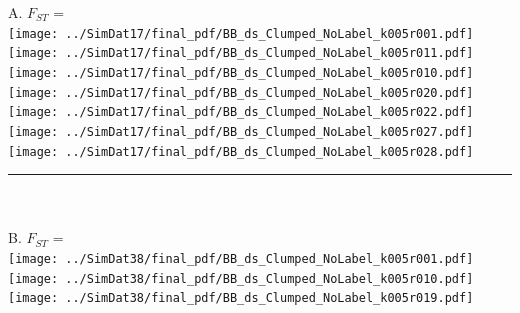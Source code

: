 \documentclass[varwidth=true, border={80, 10}]{standalone}
\newlength{\nameraise}
\newlength{\nameoverhang}
\begin{document}
 
 A. $F_{ST}$ = \\
\texttt{[image: ../SimDat17/final\_pdf/BB\_ds\_Clumped\_NoLabel\_k005r001.pdf]}~\hspace*{-\nameoverhang}\raisebox{\nameraise}{STRUCTURE A.C (9/9)} \\
\texttt{[image: ../SimDat17/final\_pdf/BB\_ds\_Clumped\_NoLabel\_k005r011.pdf]}~\hspace*{-\nameoverhang}\raisebox{\nameraise}{STRUCTURE NA.C (8/9)} \\
\texttt{[image: ../SimDat17/final\_pdf/BB\_ds\_Clumped\_NoLabel\_k005r010.pdf]}~\hspace*{-\nameoverhang}\raisebox{\nameraise}{STRUCTURE NA.C  (1/9)} \\
\texttt{[image: ../SimDat17/final\_pdf/BB\_ds\_Clumped\_NoLabel\_k005r020.pdf]}~\hspace*{-\nameoverhang}\raisebox{\nameraise}{STRUCTURE NA.NC  (7/9)} \\
\texttt{[image: ../SimDat17/final\_pdf/BB\_ds\_Clumped\_NoLabel\_k005r022.pdf]}~\hspace*{-\nameoverhang}\raisebox{\nameraise}{STRUCTURE NA.NC  (1/9)} \\
\texttt{[image: ../SimDat17/final\_pdf/BB\_ds\_Clumped\_NoLabel\_k005r027.pdf]}~\hspace*{-\nameoverhang}\raisebox{\nameraise}{STRUCTURE NA.NC  (1/9)} \\
\texttt{[image: ../SimDat17/final\_pdf/BB\_ds\_Clumped\_NoLabel\_k005r028.pdf]}~\hspace*{-\nameoverhang}\raisebox{\nameraise}{FLOCK (9/9)} \\
\noindent\rule[.5cm]{8.2in}{0.4pt}\\
\vspace{-2.5em}\\
B. $F_{ST}$ = \\
\texttt{[image: ../SimDat38/final\_pdf/BB\_ds\_Clumped\_NoLabel\_k005r001.pdf]}~\hspace*{-\nameoverhang}\raisebox{\nameraise}{STRUCTURE A.C (9/9)} \\
\texttt{[image: ../SimDat38/final\_pdf/BB\_ds\_Clumped\_NoLabel\_k005r010.pdf]}~\hspace*{-\nameoverhang}\raisebox{\nameraise}{STRUCTURE NA.C (9/9)} \\
\texttt{[image: ../SimDat38/final\_pdf/BB\_ds\_Clumped\_NoLabel\_k005r019.pdf]}~\hspace*{-\nameoverhang}\raisebox{\nameraise}{STRUCTURE NA.NC  (9/9)} \\
\end{document}
